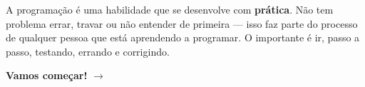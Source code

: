\vspace{0.5cm}
\begin{center}
    \textcolor{laranja}{\Large \faRocket}
    
    A programação é uma habilidade que se desenvolve com \textbf{prática}. Não tem problema errar, travar ou não entender de primeira --- isso faz parte do processo de qualquer pessoa que está aprendendo a programar. O importante é ir, passo a passo, testando, errando e corrigindo.
    
    \vspace{0.3cm}
    \textbf{\textcolor{azulPrincipal}{Vamos começar!}} \textcolor{laranja}{$\rightarrow$}
\end{center}